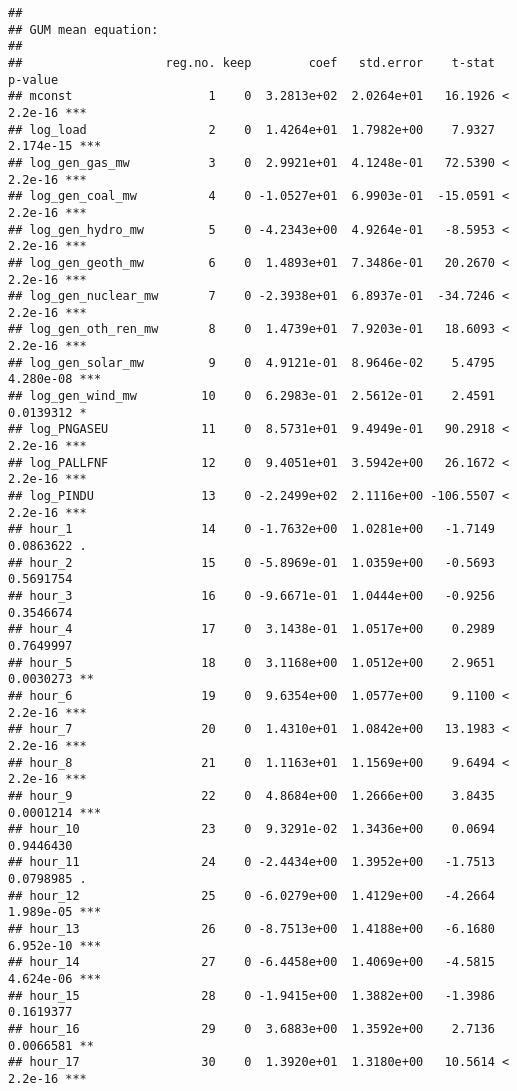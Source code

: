 \documentclass[
]{article}
\begin{document}
\begin{verbatim}
## 
## GUM mean equation:
## 
##                    reg.no. keep        coef   std.error    t-stat   p-value    
## mconst                   1    0  3.2813e+02  2.0264e+01   16.1926 < 2.2e-16 ***
## log_load                 2    0  1.4264e+01  1.7982e+00    7.9327 2.174e-15 ***
## log_gen_gas_mw           3    0  2.9921e+01  4.1248e-01   72.5390 < 2.2e-16 ***
## log_gen_coal_mw          4    0 -1.0527e+01  6.9903e-01  -15.0591 < 2.2e-16 ***
## log_gen_hydro_mw         5    0 -4.2343e+00  4.9264e-01   -8.5953 < 2.2e-16 ***
## log_gen_geoth_mw         6    0  1.4893e+01  7.3486e-01   20.2670 < 2.2e-16 ***
## log_gen_nuclear_mw       7    0 -2.3938e+01  6.8937e-01  -34.7246 < 2.2e-16 ***
## log_gen_oth_ren_mw       8    0  1.4739e+01  7.9203e-01   18.6093 < 2.2e-16 ***
## log_gen_solar_mw         9    0  4.9121e-01  8.9646e-02    5.4795 4.280e-08 ***
## log_gen_wind_mw         10    0  6.2983e-01  2.5612e-01    2.4591 0.0139312 *  
## log_PNGASEU             11    0  8.5731e+01  9.4949e-01   90.2918 < 2.2e-16 ***
## log_PALLFNF             12    0  9.4051e+01  3.5942e+00   26.1672 < 2.2e-16 ***
## log_PINDU               13    0 -2.2499e+02  2.1116e+00 -106.5507 < 2.2e-16 ***
## hour_1                  14    0 -1.7632e+00  1.0281e+00   -1.7149 0.0863622 .  
## hour_2                  15    0 -5.8969e-01  1.0359e+00   -0.5693 0.5691754    
## hour_3                  16    0 -9.6671e-01  1.0444e+00   -0.9256 0.3546674    
## hour_4                  17    0  3.1438e-01  1.0517e+00    0.2989 0.7649997    
## hour_5                  18    0  3.1168e+00  1.0512e+00    2.9651 0.0030273 ** 
## hour_6                  19    0  9.6354e+00  1.0577e+00    9.1100 < 2.2e-16 ***
## hour_7                  20    0  1.4310e+01  1.0842e+00   13.1983 < 2.2e-16 ***
## hour_8                  21    0  1.1163e+01  1.1569e+00    9.6494 < 2.2e-16 ***
## hour_9                  22    0  4.8684e+00  1.2666e+00    3.8435 0.0001214 ***
## hour_10                 23    0  9.3291e-02  1.3436e+00    0.0694 0.9446430    
## hour_11                 24    0 -2.4434e+00  1.3952e+00   -1.7513 0.0798985 .  
## hour_12                 25    0 -6.0279e+00  1.4129e+00   -4.2664 1.989e-05 ***
## hour_13                 26    0 -8.7513e+00  1.4188e+00   -6.1680 6.952e-10 ***
## hour_14                 27    0 -6.4458e+00  1.4069e+00   -4.5815 4.624e-06 ***
## hour_15                 28    0 -1.9415e+00  1.3882e+00   -1.3986 0.1619377    
## hour_16                 29    0  3.6883e+00  1.3592e+00    2.7136 0.0066581 ** 
## hour_17                 30    0  1.3920e+01  1.3180e+00   10.5614 < 2.2e-16 ***

\end{verbatim}
\end{document}
